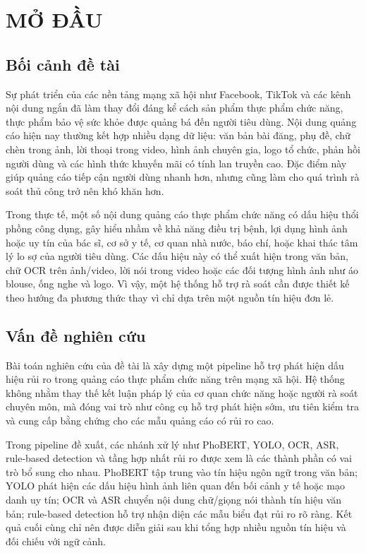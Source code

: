 \chapter{MỞ ĐẦU}

\section{Bối cảnh đề tài}
Sự phát triển của các nền tảng mạng xã hội như Facebook, TikTok và các kênh nội dung ngắn đã làm thay đổi đáng kể cách sản phẩm thực phẩm chức năng, thực phẩm bảo vệ sức khỏe được quảng bá đến người tiêu dùng. Nội dung quảng cáo hiện nay thường kết hợp nhiều dạng dữ liệu: văn bản bài đăng, phụ đề, chữ chèn trong ảnh, lời thoại trong video, hình ảnh chuyên gia, logo tổ chức, phản hồi người dùng và các hình thức khuyến mãi có tính lan truyền cao. Đặc điểm này giúp quảng cáo tiếp cận người dùng nhanh hơn, nhưng cũng làm cho quá trình rà soát thủ công trở nên khó khăn hơn.

Trong thực tế, một số nội dung quảng cáo thực phẩm chức năng có dấu hiệu thổi phồng công dụng, gây hiểu nhầm về khả năng điều trị bệnh, lợi dụng hình ảnh hoặc uy tín của bác sĩ, cơ sở y tế, cơ quan nhà nước, báo chí, hoặc khai thác tâm lý lo sợ của người tiêu dùng. Các dấu hiệu này có thể xuất hiện trong văn bản, chữ OCR trên ảnh/video, lời nói trong video hoặc các đối tượng hình ảnh như áo blouse, ống nghe và logo. Vì vậy, một hệ thống hỗ trợ rà soát cần được thiết kế theo hướng đa phương thức thay vì chỉ dựa trên một nguồn tín hiệu đơn lẻ.

\section{Vấn đề nghiên cứu}
Bài toán nghiên cứu của đề tài là xây dựng một pipeline hỗ trợ phát hiện dấu hiệu rủi ro trong quảng cáo thực phẩm chức năng trên mạng xã hội. Hệ thống không nhằm thay thế kết luận pháp lý của cơ quan chức năng hoặc người rà soát chuyên môn, mà đóng vai trò như công cụ hỗ trợ phát hiện sớm, ưu tiên kiểm tra và cung cấp bằng chứng cho các mẫu quảng cáo có rủi ro cao.

Trong pipeline đề xuất, các nhánh xử lý như PhoBERT, YOLO, OCR, ASR, rule-based detection và tầng hợp nhất rủi ro được xem là các thành phần có vai trò bổ sung cho nhau. PhoBERT tập trung vào tín hiệu ngôn ngữ trong văn bản; YOLO phát hiện các dấu hiệu hình ảnh liên quan đến bối cảnh y tế hoặc mạo danh uy tín; OCR và ASR chuyển nội dung chữ/giọng nói thành tín hiệu văn bản; rule-based detection hỗ trợ nhận diện các mẫu biểu đạt rủi ro rõ ràng. Kết quả cuối cùng chỉ nên được diễn giải sau khi tổng hợp nhiều nguồn tín hiệu và đối chiếu với ngữ cảnh.

